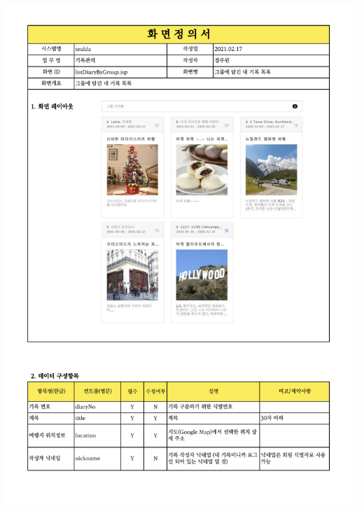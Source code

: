 {{{{{{{{{{{{{{{{{{{{{{{{{{{{{{{{{{{{{{\includegraphics[width=20cm]{./Figure/Design/Display/diary/diary_20.pdf} \\
}}}}}}}}}}}}}}}}}}}}}}}}}}}}}}}}}}}}}}
